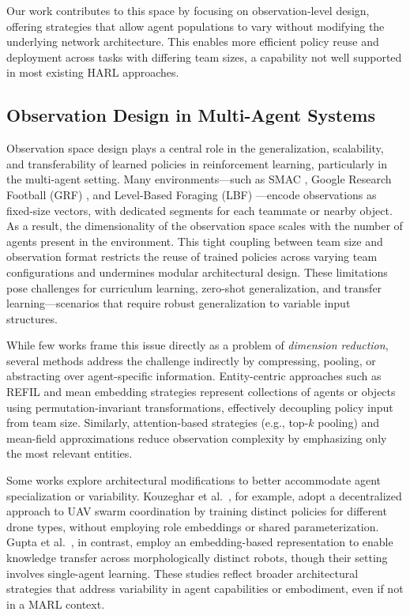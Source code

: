 \documentclass{article}
\begin{document}
Our work contributes to this space by focusing on observation-level design, offering strategies
that allow agent populations to vary without modifying the underlying network architecture.
This enables more efficient policy reuse and deployment across tasks with differing team sizes,
a capability not well supported in most existing HARL approaches.

\subsection{Observation Design in Multi-Agent Systems}

Observation space design plays a central role in the generalization, scalability, 
and transferability of learned policies in reinforcement learning, 
particularly in the multi-agent setting. 
Many environments—such as SMAC \cite{samvelyan2019}, 
Google Research Football (GRF) \cite{kurach2020}, 
and Level-Based Foraging (LBF) \cite{papoudakis2021}—encode observations as fixed-size vectors, 
with dedicated segments for each teammate or nearby object. 
As a result, the dimensionality of the observation space scales with the 
number of agents present in the environment. 
This tight coupling between team size and observation format restricts the 
reuse of trained policies across varying team configurations and undermines 
modular architectural design. These limitations pose challenges for curriculum learning, 
zero-shot generalization, and transfer learning—scenarios that require robust generalization 
to variable input structures.


While few works frame this issue directly as a problem of \textit{dimension reduction}, 
several methods address the challenge indirectly by compressing, pooling, 
or abstracting over agent-specific information. 
Entity-centric approaches such as REFIL \cite{iqbal2021} and mean embedding strategies 
\cite{huttenrauch2019} represent collections of agents or objects using permutation-invariant 
transformations, effectively decoupling policy input from team size. 
Similarly, attention-based strategies (e.g., top-$k$ pooling) and mean-field approximations 
\cite{yang2021a} reduce observation complexity by emphasizing only the most relevant entities.

Some works explore architectural modifications to better accommodate agent specialization 
or variability. Kouzeghar et al.~\cite{kouzeghar2023}, for example, adopt a decentralized 
approach to UAV swarm coordination by training distinct policies for different drone types, 
without employing role embeddings or shared parameterization. 
Gupta et al.~\cite{gupta2017a}, in contrast, employ an embedding-based representation to 
enable knowledge transfer across morphologically distinct robots, though their setting 
involves single-agent learning. These studies reflect broader architectural strategies that 
address variability in agent capabilities or embodiment, even if not in a MARL context.
\end{document}
